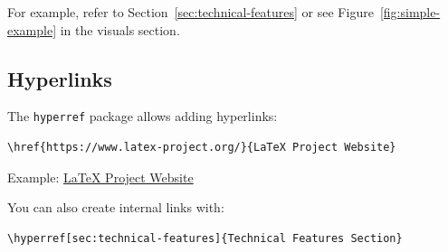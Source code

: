 For example, refer to Section~\ref{sec:technical-features} or see Figure~\ref{fig:simple-example} in the visuals section.

\subsection{Hyperlinks}\label{subsec:hyperlinks}
The \texttt{hyperref} package allows adding hyperlinks:

\begin{verbatim}
\href{https://www.latex-project.org/}{LaTeX Project Website}
\end{verbatim}

Example: \href{https://www.latex-project.org/}{LaTeX Project Website}

You can also create internal links with:

\begin{verbatim}
\hyperref[sec:technical-features]{Technical Features Section}
\end{verbatim}